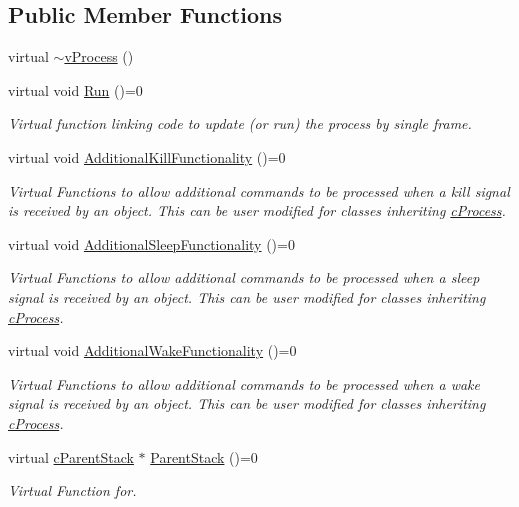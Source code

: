 \subsection*{Public Member Functions}
\begin{DoxyCompactItemize}
\item 
virtual \hyperlink{classv_process_aa62b370bff310015da5febd47c00d9f6}{$\sim$vProcess} ()
\item 
virtual void \hyperlink{classv_process_ad4805bf4b4f42ec0e63038688ef80934}{Run} ()=0
\begin{DoxyCompactList}\small\item\em Virtual function linking code to update (or run) the process by single frame. \item\end{DoxyCompactList}\item 
virtual void \hyperlink{classv_process_a85cf6af1cf0e6c787fc74f96c98ceb5c}{AdditionalKillFunctionality} ()=0
\begin{DoxyCompactList}\small\item\em Virtual Functions to allow additional commands to be processed when a kill signal is received by an object. This can be user modified for classes inheriting \hyperlink{classc_process}{cProcess}. \item\end{DoxyCompactList}\item 
virtual void \hyperlink{classv_process_a1cde6e05b052df01dcafa92f546e403e}{AdditionalSleepFunctionality} ()=0
\begin{DoxyCompactList}\small\item\em Virtual Functions to allow additional commands to be processed when a sleep signal is received by an object. This can be user modified for classes inheriting \hyperlink{classc_process}{cProcess}. \item\end{DoxyCompactList}\item 
virtual void \hyperlink{classv_process_ae85b4a809032841b553a7f2e7440750b}{AdditionalWakeFunctionality} ()=0
\begin{DoxyCompactList}\small\item\em Virtual Functions to allow additional commands to be processed when a wake signal is received by an object. This can be user modified for classes inheriting \hyperlink{classc_process}{cProcess}. \item\end{DoxyCompactList}\item 
virtual \hyperlink{classc_parent_stack}{cParentStack} $\ast$ \hyperlink{classv_process_a6d004f2866ad23c997fc09b3d664e20d}{ParentStack} ()=0
\begin{DoxyCompactList}\small\item\em Virtual Function for. \item\end{DoxyCompactList}\end{DoxyCompactItemize}


